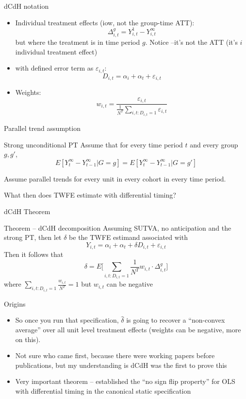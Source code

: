 \documentclass{beamer}
\begin{document}
\begin{frame}{dCdH notation}

\begin{itemize}
\item Individual treatment effects (iow, not the group-time ATT): $$\Delta^g_{i,t} = Y^1_{i,t} - Y^\infty_{i,t}$$ but where the treatment is in time period $g$. Notice --it's not the ATT (it's $i$ individual treatment effect)
\item with defined error term as $\varepsilon_{i,t}$: $$D_{i,t} = \alpha_i + \alpha_t + \varepsilon_{i,t}$$
\item Weights: $$w_{i,t} = \frac{\varepsilon_{i,t}}{\frac{1}{N^T} \sum_{i,t:D_{i,t}=1} \varepsilon_{i,t}}$$
\end{itemize}

\end{frame}

\begin{frame}{Parallel trend assumption}

\begin{block}{Strong unconditional PT}
Assume that for every time period $t$ and every group $g,g'$, $$E[Y^\infty_t - Y^\infty_{t-1}|G=g] = E[Y^\infty_t - Y^\infty_{t-1}|G=g'] $$
\end{block}Assume parallel trends for every unit in every cohort in every time period.

\bigskip

What then does TWFE estimate with differential timing?

\end{frame}

\begin{frame}{dCdH Theorem}

\begin{block}{Theorem -- dCdH decomposition}
Assuming SUTVA, no anticipation and the strong PT, then let $\delta$ be the TWFE estimand associated with $$Y_{i,t} = \alpha_i + \alpha_t + \delta D_{i,t} + \varepsilon_{i,t}$$Then it follows that $$\delta = E \bigg [ \sum_{i,t:D_{i,t}=1} \frac{1}{N^T} w_{i,t} \cdot \Delta_{i,t}^g \bigg ] $$ where $\sum_{i,t:D_{i,t}=1} \frac{w_{i,t}}{N^T} = 1$ but $w_{i,t}$ can be negative
\end{block}

\end{frame}

\begin{frame}{Origins}

\begin{itemize}
\item So once you run that specification, $\widehat{\delta}$ is going to recover a ``non-convex average'' over all unit level treatment effects (weights can be negative, more on this). 
\item Not sure who came first, because there were working papers before publications, but my understanding is dCdH was the first to prove this
\item Very important theorem -- established the ``no sign flip property'' for OLS with differential timing in the canonical static specification
\end{itemize}

\end{frame}
\end{document}
